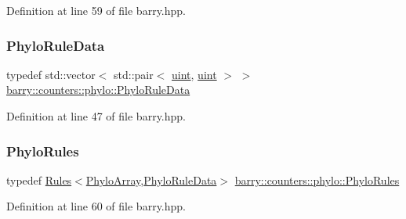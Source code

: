 Definition at line 59 of file barry.\+hpp.

\mbox{\label{namespacebarry_1_1counters_1_1phylo_a5da540950bcf3372bcedb17a5b23667c}} 
\subsubsection{\texorpdfstring{Phylo\+Rule\+Data}{PhyloRuleData}}
{\footnotesize\ttfamily typedef std\+::vector$<$ std\+::pair$<$ \hyperlink{namespacebarry_a11dfc53ddb4672278319aa04f1e09a6c}{uint}, \hyperlink{namespacebarry_a11dfc53ddb4672278319aa04f1e09a6c}{uint} $>$ $>$ \hyperlink{namespacebarry_1_1counters_1_1phylo_a5da540950bcf3372bcedb17a5b23667c}{barry\+::counters\+::phylo\+::\+Phylo\+Rule\+Data}}



Definition at line 47 of file barry.\+hpp.

\mbox{\label{namespacebarry_1_1counters_1_1phylo_a7c915b4eab922a92797db96a7e8917c4}} 
\subsubsection{\texorpdfstring{Phylo\+Rules}{PhyloRules}}
{\footnotesize\ttfamily typedef \hyperlink{classbarry_1_1_rules}{Rules}$<$\hyperlink{namespacebarry_1_1counters_1_1phylo_abd293bf65e494e903639fb5fb2c91604}{Phylo\+Array},\hyperlink{namespacebarry_1_1counters_1_1phylo_a5da540950bcf3372bcedb17a5b23667c}{Phylo\+Rule\+Data}$>$ \hyperlink{namespacebarry_1_1counters_1_1phylo_a7c915b4eab922a92797db96a7e8917c4}{barry\+::counters\+::phylo\+::\+Phylo\+Rules}}



Definition at line 60 of file barry.\+hpp.

\mbox{\label{namespacebarry_1_1counters_1_1phylo_abfefb6cff81a19d278b306a79cc011a3}} 
